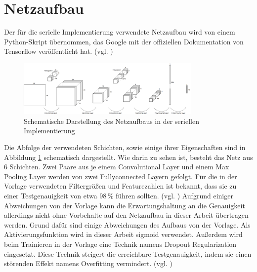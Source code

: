\documentclass[../main.tex]{subfiles}
\begin{document}
\section{Netzaufbau}
Der für die serielle Implementierung verwendete Netzaufbau wird von einem Python-Skript übernommen, das Google mit der offiziellen Dokumentation von Tensorflow veröffentlicht hat. (vgl. \cite{tensorflowTutorial})
\begin{figure}
    \centering 
       \includegraphics[width=0.8\textwidth]{../images/Benz/Aufbau_Netzwerk.png} 
    \caption {Schematische Darstellung des Netzaufbaus in der seriellen Implementierung} 
    \label{pic:AufbauNetzwerkSerial} 
\end{figure} 
Die Abfolge der verwendeten Schichten, sowie einige ihrer Eigenschaften sind in Abbildung \ref{pic:AufbauNetzwerkSerial} schematisch dargestellt. Wie darin zu sehen ist, besteht das Netz aus 6 Schichten. Zwei Paare aus je einem Convolutional Layer und einem Max Pooling Layer werden von zwei Fullyconnected Layern gefolgt. Für die in der Vorlage verwendeten Filtergrößen und Featurezahlen ist bekannt, dass sie zu einer Testgenauigkeit von etwa 98\,\% führen sollten. (vgl. \cite{tensorflowTutorial}) Aufgrund einiger Abweichungen von der Vorlage kann die Erwartungshaltung an die Genauigkeit allerdings nicht ohne Vorbehalte auf den Netzaufbau in dieser Arbeit übertragen werden. Grund dafür sind einige Abweichungen des Aufbaus von der Vorlage. Als Aktivierungsfunktion wird in dieser Arbeit sigmoid verwendet. Außerdem wird beim Trainieren in der Vorlage eine Technik namens Dropout Regularization eingesetzt. Diese Technik steigert die erreichbare Testgenauigkeit, indem sie einen störenden Effekt namens Overfitting vermindert. (vgl. \cite{neuralNetworksAndDeepLearning})
\end{document}
